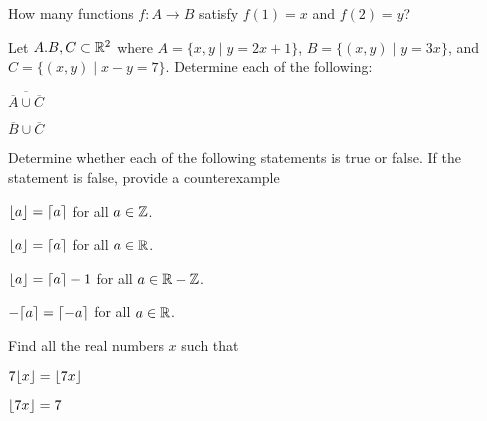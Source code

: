 \documentclass[a4paper, english, 12pt]{article} %
\begin{document}
\begin{subproblem}
  How many functions $f \colon A \to B$ satisfy $f(1) = x$ and $f(2) = y$?
\end{subproblem}

\begin{problem}[5]
  Let $A. B, C \subset \mathbb{R}^2$ where $A = \{{x,y} \mid y = 2x + 1\}$, $B = \{(x,y)
  \mid y = 3x\}$, and $C = \{(x, y) \mid x - y = 7\}$. Determine each of the following:
\end{problem}

\begin{subproblem}[3]
  $\overline{\overline{A} \cup \overline{C}}$
\end{subproblem}

\begin{subproblem}
  $\overline{B} \cup \overline{C}$
\end{subproblem}

\begin{problem}[8]
  Determine whether each of the following statements is true or false. If the
  statement is false, provide a counterexample
\end{problem}

\begin{subproblem}
  $\lfloor a\rfloor = \lceil a\rceil$ for all $a \in \mathbb{Z}$.
\end{subproblem}

\begin{subproblem}
  $\lfloor a\rfloor = \lceil a\rceil$ for all $a \in \mathbb{R}$.
\end{subproblem}

\begin{subproblem}
  $\lfloor a\rfloor = \lceil a\rceil - 1$ for all $a \in \mathbb{R} - \mathbb{Z}$.
\end{subproblem}

\begin{subproblem}
  $-\lceil a\rceil = \lceil-a\rceil$ for all $a \in \mathbb{R}$.
\end{subproblem}

\begin{problem}
  Find all the real numbers $x$ such that
\end{problem}

\begin{subproblem}
  $7 \lfloor x\rfloor = \lfloor7x\rfloor$
\end{subproblem}

\begin{subproblem}
  $\lfloor7x\rfloor = 7$
\end{subproblem}
\end{document}
